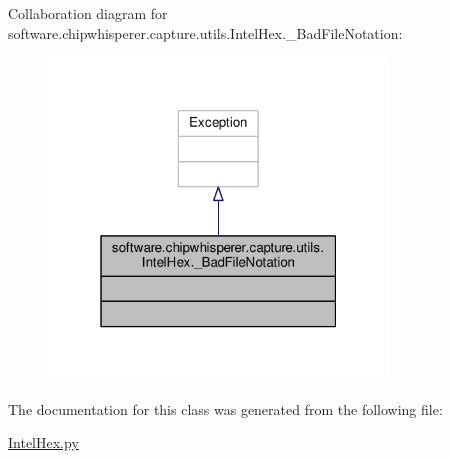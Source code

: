 Collaboration diagram for software.\+chipwhisperer.\+capture.\+utils.\+Intel\+Hex.\+\_\+\+Bad\+File\+Notation\+:\nopagebreak
\begin{figure}[H]
\begin{center}
\leavevmode
\includegraphics[width=256pt]{d8/d76/classsoftware_1_1chipwhisperer_1_1capture_1_1utils_1_1IntelHex_1_1__BadFileNotation__coll__graph}
\end{center}
\end{figure}


The documentation for this class was generated from the following file\+:\begin{DoxyCompactItemize}
\item 
\hyperlink{IntelHex_8py}{Intel\+Hex.\+py}\end{DoxyCompactItemize}
